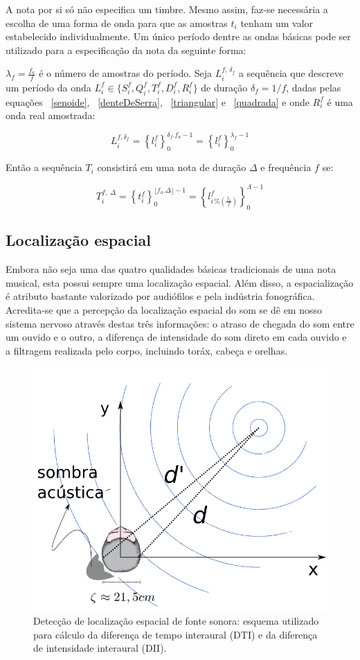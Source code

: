 A nota por si só não especifica um timbre. Mesmo assim, faz-se necessária a escolha de uma forma de onda para que as amostras $t_i$ tenham um valor estabelecido individualmente. Um único período dentre as ondas básicas pode ser utilizado para a especificação da nota da seguinte forma:

$\lambda_f=\frac{f_a}{f}$ é o número de amostras do período. Seja $L_i^{f,\, \delta_f} $
a sequência que descreve um período da onda $L_i^f \in \{S_i^f,Q_i^f,T_i^f,D_i^f,R_i^f \}$ de duração 
$\delta_f=1/f$, dadas pelas equações ~\ref{senoide}, ~\ref{denteDeSerra}, ~\ref{triangular} e ~\ref{quadrada} e onde $R_i^f$ é
uma onda real amostrada:

\begin{equation}\label{periodoUnico}
L_i^{f , \delta_f } = \left\{ l_i^f \right\}_0^{\delta_f . f_a -1}=\left\{ l_i^f \right\}_0^{\lambda_f-1}
\end{equation}

Então a sequência $T_i$ consistirá em uma nota de duração $\Delta$ e frequência $f$ se:

\begin{equation}\label{eq:notaBasicaTimbre}
T_i^{f,\; \Delta}=\left\{t_i^f\right\}_0^{\lfloor f_a . \Delta \rfloor -1}=\left \{ l^f_{i\,\%\left(\frac{f_a}{f}\right)} \right \}_0^{\Lambda-1}
\end{equation}

\subsection{Localização espacial}
Embora não seja uma das quatro qualidades básicas tradicionais de uma nota musical, esta possui sempre uma localização espacial. Além disso, a espacialização é atributo bastante valorizado
 por audiófilos e pela indústria fonográfica.\cite{floEsp}
Acredita-se que a percepção da localização espacial do som se dê em nosso sistema nervoso através destas
três informações: o atraso de chegada do som entre um ouvido e o outro, a diferença de intensidade do som direto em cada ouvido e a 
filtragem realizada pelo corpo, incluindo toráx, cabeça e orelhas.\cite{Roederer, hrtf, Heeger}


\begin{figure}[h!]
    \centering
        \includegraphics[width=.5\textwidth]{figuras/espacializacao___}
    \caption{Detecção de localização espacial de fonte sonora: esquema utilizado para cálculo da diferença de tempo interaural (DTI) e da diferença de intensidade interaural (DII).}
        \label{fig:spac}
\end{figure}



